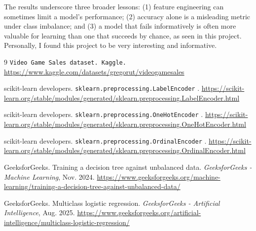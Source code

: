 \documentclass[sigconf]{acmart}
\begin{document}
The results underscore three broader lessons: (1) feature engineering can sometimes limit a model's performance; (2) accuracy alone
is a misleading metric under class imbalance; and (3) a model that fails informatively is often more valuable for learning than one that
succeeds by chance, as seen in this project. Personally, I found this project to be very interesting and informative.

\begin{thebibliography}{9}
\newblock \texttt{Video Game Sales dataset. Kaggle. } 
\url{https://www.kaggle.com/datasets/gregorut/videogamesales}

scikit-learn developers.
\newblock \texttt{sklearn.preprocessing.LabelEncoder}
.
\newblock \url{https://scikit-learn.org/stable/modules/generated/sklearn.preprocessing.LabelEncoder.html}

scikit-learn developers.
\newblock \texttt{sklearn.preprocessing.OneHotEncoder}
.
\newblock \url{https://scikit-learn.org/stable/modules/generated/sklearn.preprocessing.OneHotEncoder.html}

scikit-learn developers.
\newblock \texttt{sklearn.preprocessing.OrdinalEncoder}
.
\newblock \url{https://scikit-learn.org/stable/modules/generated/sklearn.preprocessing.OrdinalEncoder.html}

GeeksforGeeks.
\newblock Training a decision tree against unbalanced data.
\newblock \textit{GeeksforGeeks - Machine Learning}, Nov. 2024.
\newblock \url{https://www.geeksforgeeks.org/machine-learning/training-a-decision-tree-against-unbalanced-data/}

GeeksforGeeks.
\newblock Multiclass logistic regression.
\newblock \textit{GeeksforGeeks - Artificial Intelligence}, Aug. 2025.
\newblock \url{https://www.geeksforgeeks.org/artificial-intelligence/multiclass-logistic-regression/}

\end{thebibliography}
\end{document}
